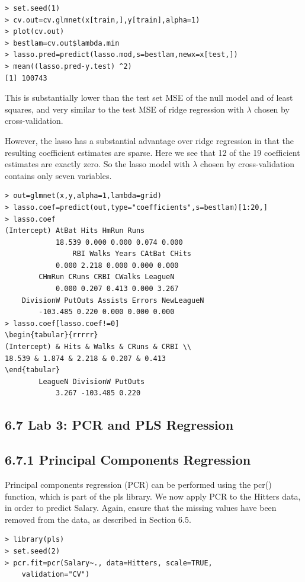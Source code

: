 \documentclass[10pt]{article}
\begin{document}
\begin{verbatim}
> set.seed(1)
> cv.out=cv.glmnet(x[train,],y[train],alpha=1)
> plot(cv.out)
> bestlam=cv.out$lambda.min
> lasso.pred=predict(lasso.mod,s=bestlam,newx=x[test,])
> mean((lasso.pred-y.test) ^2)
[1] 100743
\end{verbatim}

This is substantially lower than the test set MSE of the null model and of least squares, and very similar to the test MSE of ridge regression with $\lambda$ chosen by cross-validation.

However, the lasso has a substantial advantage over ridge regression in that the resulting coefficient estimates are sparse. Here we see that 12 of the 19 coefficient estimates are exactly zero. So the lasso model with $\lambda$ chosen by cross-validation contains only seven variables.

\begin{verbatim}
> out=glmnet(x,y,alpha=1,lambda=grid)
> lasso.coef=predict(out,type="coefficients",s=bestlam)[1:20,]
> lasso.coef
(Intercept) AtBat Hits HmRun Runs
            18.539 0.000 0.000 0.074 0.000
                RBI Walks Years CAtBat CHits
            0.000 2.218 0.000 0.000 0.000
        CHmRun CRuns CRBI CWalks LeagueN
            0.000 0.207 0.413 0.000 3.267
    DivisionW PutOuts Assists Errors NewLeagueN
        -103.485 0.220 0.000 0.000 0.000
> lasso.coef[lasso.coef!=0]
\begin{tabular}{rrrrr} 
(Intercept) & Hits & Walks & CRuns & CRBI \\
18.539 & 1.874 & 2.218 & 0.207 & 0.413
\end{tabular}
        LeagueN DivisionW PutOuts
            3.267 -103.485 0.220
\end{verbatim}

\subsection*{6.7 Lab 3: PCR and PLS Regression}
\subsection*{6.7.1 Principal Components Regression}
Principal components regression (PCR) can be performed using the pcr() function, which is part of the pls library. We now apply PCR to the Hitters data, in order to predict Salary. Again, ensure that the missing values have been removed from the data, as described in Section 6.5.

\begin{verbatim}
> library(pls)
> set.seed(2)
> pcr.fit=pcr(Salary~., data=Hitters, scale=TRUE,
    validation="CV")
\end{verbatim}
\end{document}
